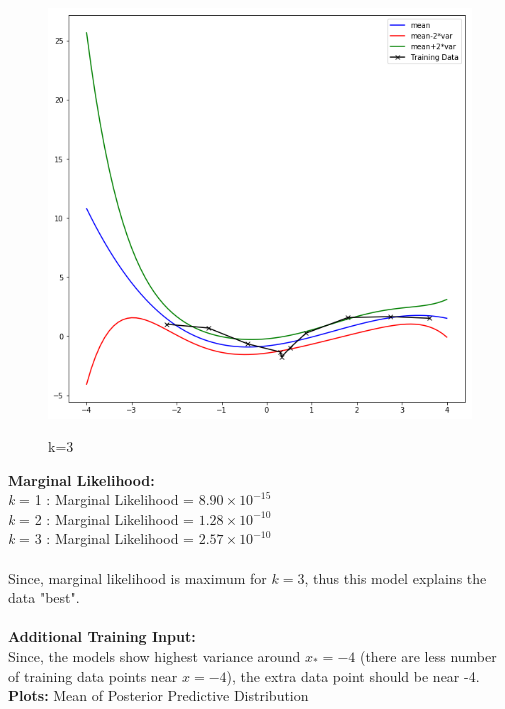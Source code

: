 \documentclass{article}
\begin{document}
\begin{figure}[h!]
\begin{center}
\includegraphics[scale=0.5]{three.png}
\label{three}
\caption{k=3}
\end{center}
\end{figure}

\textbf{Marginal Likelihood: } \\
\textit k = 1 : Marginal Likelihood = $8.90 \times 10^{-15}$ \\
\textit k = 2 : Marginal Likelihood = $1.28 \times 10^{-10}$ \\
\textit k = 3 : Marginal Likelihood = $2.57 \times 10^{-10}$ \\ \\
Since, marginal likelihood is maximum for $k=3$, thus this model explains the data "best". \\ \\
\textbf{Additional Training Input: }\\
Since, the models show highest variance around $x_* = -4$ (there are less number of training data points near $x = -4$), the extra data point should be near -4. \\
\textbf{Plots:} Mean of Posterior Predictive Distribution \\
\end{document}

